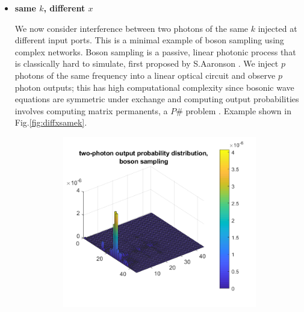 \begin{itemize}
    
    \item \textbf{same $k$, different $x$}
    
    We now consider interference between two photons of the same $k$ injected at different input ports. This is a minimal example of boson sampling using complex networks. Boson sampling is a passive, linear photonic process that is classically hard to simulate, first proposed by S.Aaronson \cite{Aaronson2010}. We inject $p$ photons of the same frequency into a linear optical circuit and observe $p$ photon outputs; this has high computational complexity since bosonic wave equations are symmetric under exchange and computing output probabilities involves computing matrix permanents, a $P\#$ problem \cite{Gard2014}. Example shown in Fig.\ref{fig:diffxsamek}.
    
    \begin{figure}[ht]
    \centering
    \begin{subfigure}[b]{0.5\textwidth}
        \includegraphics[width=\textwidth]{ch3/fig3/BS_Q.png}
    \end{subfigure}
    ~
    \begin{subfigure}[b]{0.4\textwidth}

\end{subfigure}
\end{figure}
\end{itemize}

